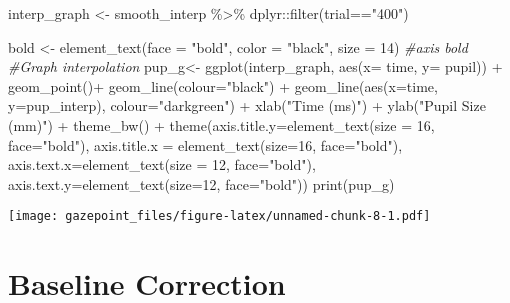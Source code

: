 \documentclass[
]{article}
\newenvironment{Shaded}{\begin{snugshade}}{\end{snugshade}}
\newcommand{\AttributeTok}[1]{\textcolor[rgb]{0.77,0.63,0.00}{#1}}
\newcommand{\CommentTok}[1]{\textcolor[rgb]{0.56,0.35,0.01}{\textit{#1}}}
\newcommand{\DecValTok}[1]{\textcolor[rgb]{0.00,0.00,0.81}{#1}}
\newcommand{\FunctionTok}[1]{\textcolor[rgb]{0.00,0.00,0.00}{#1}}
\newcommand{\NormalTok}[1]{#1}
\newcommand{\OtherTok}[1]{\textcolor[rgb]{0.56,0.35,0.01}{#1}}
\newcommand{\SpecialCharTok}[1]{\textcolor[rgb]{0.00,0.00,0.00}{#1}}
\newcommand{\StringTok}[1]{\textcolor[rgb]{0.31,0.60,0.02}{#1}}
\begin{document}
\begin{Shaded}
\begin{Highlighting}[]
\NormalTok{interp\_graph }\OtherTok{\textless{}{-}}\NormalTok{ smooth\_interp  }\SpecialCharTok{\%\textgreater{}\%}
\NormalTok{  dplyr}\SpecialCharTok{::}\FunctionTok{filter}\NormalTok{(trial}\SpecialCharTok{==}\StringTok{"400"}\NormalTok{)}

\NormalTok{bold }\OtherTok{\textless{}{-}} \FunctionTok{element\_text}\NormalTok{(}\AttributeTok{face =} \StringTok{"bold"}\NormalTok{, }\AttributeTok{color =} \StringTok{"black"}\NormalTok{, }\AttributeTok{size =} \DecValTok{14}\NormalTok{) }\CommentTok{\#axis bold}
\CommentTok{\#Graph interpolation}
\NormalTok{pup\_g}\OtherTok{\textless{}{-}} \FunctionTok{ggplot}\NormalTok{(interp\_graph, }\FunctionTok{aes}\NormalTok{(}\AttributeTok{x=}\NormalTok{ time, }\AttributeTok{y=}\NormalTok{ pupil)) }\SpecialCharTok{+} \FunctionTok{geom\_point}\NormalTok{()}\SpecialCharTok{+} \FunctionTok{geom\_line}\NormalTok{(}\AttributeTok{colour=}\StringTok{"black"}\NormalTok{) }\SpecialCharTok{+}
  \FunctionTok{geom\_line}\NormalTok{(}\FunctionTok{aes}\NormalTok{(}\AttributeTok{x=}\NormalTok{time, }\AttributeTok{y=}\NormalTok{pup\_interp), }\AttributeTok{colour=}\StringTok{"darkgreen"}\NormalTok{) }\SpecialCharTok{+} \FunctionTok{xlab}\NormalTok{(}\StringTok{"Time (ms)"}\NormalTok{) }\SpecialCharTok{+} \FunctionTok{ylab}\NormalTok{(}\StringTok{"Pupil Size (mm)"}\NormalTok{) }\SpecialCharTok{+} \FunctionTok{theme\_bw}\NormalTok{() }\SpecialCharTok{+} \FunctionTok{theme}\NormalTok{(}\AttributeTok{axis.title.y=}\FunctionTok{element\_text}\NormalTok{(}\AttributeTok{size =} \DecValTok{16}\NormalTok{, }\AttributeTok{face=}\StringTok{"bold"}\NormalTok{), }\AttributeTok{axis.title.x =} \FunctionTok{element\_text}\NormalTok{(}\AttributeTok{size=}\DecValTok{16}\NormalTok{, }\AttributeTok{face=}\StringTok{"bold"}\NormalTok{), }\AttributeTok{axis.text.x=}\FunctionTok{element\_text}\NormalTok{(}\AttributeTok{size =} \DecValTok{12}\NormalTok{, }\AttributeTok{face=}\StringTok{"bold"}\NormalTok{), }\AttributeTok{axis.text.y=}\FunctionTok{element\_text}\NormalTok{(}\AttributeTok{size=}\DecValTok{12}\NormalTok{, }\AttributeTok{face=}\StringTok{"bold"}\NormalTok{))}
\FunctionTok{print}\NormalTok{(pup\_g)}
\end{Highlighting}
\end{Shaded}

\texttt{[image: gazepoint\_files/figure-latex/unnamed-chunk-8-1.pdf]}

\hypertarget{baseline-correction}{%
\section{Baseline Correction}\label{baseline-correction}}
\end{document}
